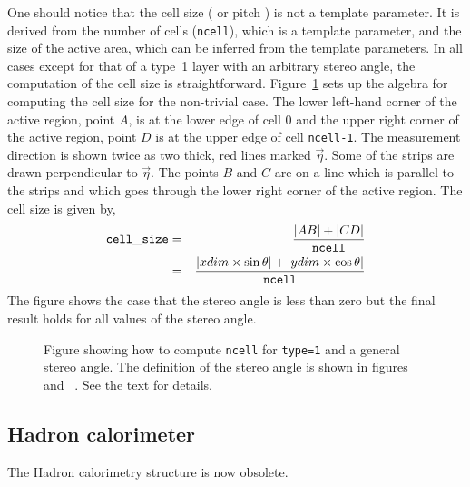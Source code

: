 One should notice that the cell size ( or pitch ) is not
a template parameter.  It is derived from the number of cells ({\tt ncell}),
which is a template parameter, and the size of the active area, which
can be inferred from the template parameters.  In all cases except for
that of
a type~1 layer with an arbitrary stereo angle, the computation of
the cell size is straightforward.
Figure~\ref{ftrk6} sets up the algebra for computing the cell size for
the non-trivial case.   The lower left-hand 
corner of the active region, point $A$, is at the lower edge of cell 0
and the upper right corner of the active region, point $D$ is at the
upper edge of cell {\tt ncell-1}.  The measurement direction is shown
twice as two thick, red lines marked $\vec{\eta}$. 
Some of the strips are drawn perpendicular to $\vec{\eta}$.  
The points $B$ and $C$ are on a line which is parallel to the strips 
and which goes through the lower right corner of the active region.   
The cell size is given by,
\begin{eqnarray}
{\tt cell\_size} &=& \frac{|AB|+|CD|}{\tt ncell} \nonumber \\
&=& \frac{|xdim\times\sin{\theta}| + | ydim\times\cos{\theta}|}
     {\tt ncell}
\end{eqnarray}
The figure shows the case that the stereo angle is less than zero but
the final result holds for all values of the stereo angle.
%
\begin{figure} [btp]
\centerline{\epsfysize=3.0in }
\caption{\label{ftrk6}  Figure showing how to compute {\tt ncell} for
{\tt type=1} and a general stereo angle. The definition of
the stereo angle is shown in figures~\protect{\ref{ftrk1}}
and ~\protect{\ref{ftrk2}}.  See the text for details. }
\end{figure}


\newpage
\subsection{Hadron calorimeter}  

The Hadron calorimetry structure is now obsolete.  
  
